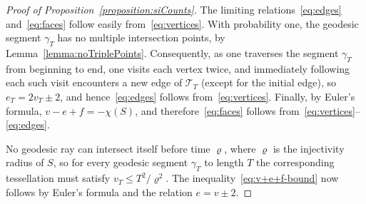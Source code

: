 \documentclass[10pt]{amsart}
\theoremstyle{definition}\newtheorem{defi}[theo]{Definition}\newtheorem{rema}[theo]{Remark}\newtheorem{exam}[theo]{Example}\newtheorem{exem}[theo]{Example}\newtheorem{nota}[theo]{Notation}
\begin{document}
\begin{proof}[Proof of Proposition~\ref{proposition:siCounts}]
The limiting relations~\eqref{eq:edges} and~\eqref{eq:faces} follow easily from~\eqref{eq:vertices}. With probability one, the geodesic segment $\gamma_{T}$ has no multiple intersection points, by Lemma~\ref{lemma:noTriplePoints}. Consequently, as one traverses the segment $\gamma_{T}$ from beginning to end, one visits each vertex twice, and immediately following each such visit encounters a new edge of $\mathcal{T}_{T}$ (except for the initial edge), so $e_{T}=2v_{T}\pm 2$, and hence~\eqref{eq:edges} follows from~\eqref{eq:vertices}. Finally, by Euler's formula, $v-e+f=-\chi (S)$, and therefore~\eqref{eq:faces} follows from~\eqref{eq:vertices}--\eqref{eq:edges}.


No geodesic ray can intersect itself before time $\varrho $, where $\varrho $ is the injectivity radius of $S$, so for every geodesic segment $\gamma_{T}$ to length $T$ the corresponding tessellation must satisfy $v_{T}\leq T^{2}/ \varrho^{2}$. The inequality~\eqref{eq:v+e+f-bound} now follows by Euler's formula and the relation $e=v\pm 2$.
\end{proof}
\end{document}
